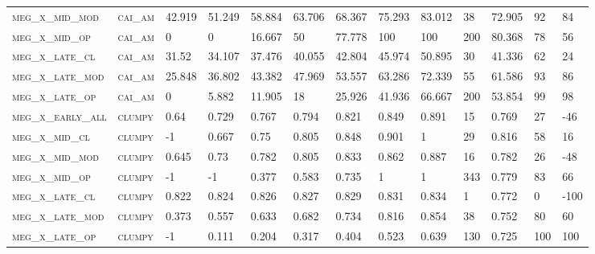 \begin{landscape}
\begin{center}
\begin{footnotesize}
\begin{longtable}{lllllllllllll}
\textsc{meg\_x\_mid\_mod  } & \textsc{cai\_am   }   & 42.919   & 51.249   & 58.884   & 63.706   & 68.367   & 75.293   & 83.012    & 38     & 72.905        & 92            & 84            \\
\textsc{meg\_x\_mid\_op   } & \textsc{cai\_am   }   & 0        & 0        & 16.667   & 50       & 77.778   & 100      & 100       & 200    & 80.368        & 78            & 56            \\
\textsc{meg\_x\_late\_cl  } & \textsc{cai\_am   }   & 31.52    & 34.107   & 37.476   & 40.055   & 42.804   & 45.974   & 50.895    & 30     & 41.336        & 62            & 24            \\
\textsc{meg\_x\_late\_mod } & \textsc{cai\_am   }   & 25.848   & 36.802   & 43.382   & 47.969   & 53.557   & 63.286   & 72.339    & 55     & 61.586        & 93            & 86            \\
\textsc{meg\_x\_late\_op  } & \textsc{cai\_am   }   & 0        & 5.882    & 11.905   & 18       & 25.926   & 41.936   & 66.667    & 200    & 53.854        & 99            & 98            \\
\textsc{meg\_x\_early\_all} & \textsc{clumpy    }   & 0.64     & 0.729    & 0.767    & 0.794    & 0.821    & 0.849    & 0.891     & 15     & 0.769         & 27            & -46           \\
\textsc{meg\_x\_mid\_cl   } & \textsc{clumpy    }   & -1       & 0.667    & 0.75     & 0.805    & 0.848    & 0.901    & 1         & 29     & 0.816         & 58            & 16            \\
\textsc{meg\_x\_mid\_mod  } & \textsc{clumpy    }   & 0.645    & 0.73     & 0.782    & 0.805    & 0.833    & 0.862    & 0.887     & 16     & 0.782         & 26            & -48           \\
\textsc{meg\_x\_mid\_op   } & \textsc{clumpy    }   & -1       & -1       & 0.377    & 0.583    & 0.735    & 1        & 1         & 343    & 0.779         & 83            & 66            \\
\textsc{meg\_x\_late\_cl  } & \textsc{clumpy    }   & 0.822    & 0.824    & 0.826    & 0.827    & 0.829    & 0.831    & 0.834     & 1      & 0.772         & 0             & -100          \\
\textsc{meg\_x\_late\_mod } & \textsc{clumpy    }   & 0.373    & 0.557    & 0.633    & 0.682    & 0.734    & 0.816    & 0.854     & 38     & 0.752         & 80            & 60            \\
\textsc{meg\_x\_late\_op  } & \textsc{clumpy    }   & -1       & 0.111    & 0.204    & 0.317    & 0.404    & 0.523    & 0.639     & 130    & 0.725         & 100           & 100           \\

\end{longtable}
\end{footnotesize}
\end{center}
\end{landscape}

